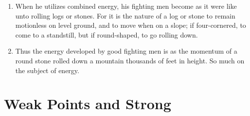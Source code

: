 \begin{enumerate}
  \item When he utilizes combined energy, his fighting men become as
    it were like unto rolling logs or stones. For it is the nature of
    a log or stone to remain motionless on level ground, and to move
    when on a slope; if four-cornered, to come to a standstill, but if
    round-shaped, to go rolling down.

  \item Thus the energy developed by good fighting men is as the
    momentum of a round stone rolled down a mountain thousands of feet
    in height. So much on the subject of energy.

  \end{enumerate}

\addtocounter{chapter}{1}\chapter*{Weak Points and Strong}

